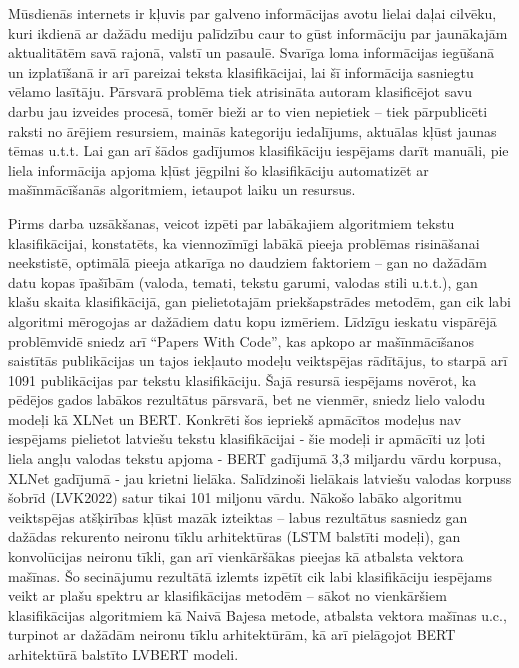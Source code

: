 Mūsdienās internets ir kļuvis par galveno informācijas avotu lielai daļai cilvēku, kuri ikdienā ar dažādu mediju palīdzību caur to gūst informāciju par jaunākajām aktualitātēm savā rajonā, valstī un pasaulē. Svarīga loma informācijas iegūšanā un izplatīšanā ir arī pareizai teksta klasifikācijai, lai šī informācija sasniegtu vēlamo lasītāju. Pārsvarā problēma tiek atrisināta autoram klasificējot savu darbu jau izveides procesā, tomēr bieži ar to vien nepietiek – tiek pārpublicēti raksti no ārējiem resursiem, mainās kategoriju iedalījums, aktuālas kļūst jaunas tēmas u.t.t. Lai gan arī šādos gadījumos klasifikāciju iespējams darīt manuāli, pie liela informācija apjoma kļūst jēgpilni šo klasifikāciju automatizēt ar mašīnmācīšanās algoritmiem, ietaupot laiku un resursus. 

Pirms darba uzsākšanas, veicot izpēti par labākajiem algoritmiem tekstu klasifikācijai, konstatēts, ka viennozīmīgi labākā pieeja problēmas risināšanai neekstistē, optimālā pieeja atkarīga no daudziem faktoriem – gan no dažādām datu kopas īpašībām (valoda, temati, tekstu garumi, valodas stili u.t.t.), gan klašu skaita klasifikācijā, gan pielietotajām priekšapstrādes metodēm, gan cik labi algoritmi mērogojas ar dažādiem datu kopu izmēriem. Līdzīgu ieskatu vispārējā problēmvidē sniedz arī “Papers With Code”, kas apkopo ar mašīnmācīšanos saistītās publikācijas un tajos iekļauto modeļu veiktspējas rādītājus, to starpā arī 1091 publikācijas par tekstu klasifikāciju. Šajā resursā iespējams novērot, ka pēdējos gados labākos rezultātus pārsvarā, bet ne vienmēr, sniedz lielo valodu modeļi kā XLNet un BERT. Konkrēti šos iepriekš apmācītos modeļus nav iespējams pielietot latviešu tekstu klasifikācijai - šie modeļi ir apmācīti uz ļoti liela angļu valodas tekstu apjoma - BERT gadījumā 3,3 miljardu vārdu korpusa, XLNet gadījumā - jau krietni lielāka. Salīdzinoši lielākais latviešu valodas korpuss šobrīd (LVK2022) satur tikai 101 miljonu vārdu. Nākošo labāko algoritmu veiktspējas atšķirības kļūst mazāk izteiktas – labus rezultātus sasniedz gan dažādas rekurento neironu tīklu arhitektūras (LSTM balstīti modeļi), gan konvolūcijas neironu tīkli, gan arī vienkāršākas pieejas kā atbalsta vektora mašīnas. Šo secinājumu rezultātā izlemts izpētīt cik labi klasifikāciju iespējams veikt ar plašu spektru ar klasifikācijas metodēm – sākot no vienkāršiem klasifikācijas algoritmiem kā Naivā Bajesa metode, atbalsta vektora mašīnas u.c., turpinot ar dažādām neironu tīklu arhitektūrām, kā arī pielāgojot BERT arhitektūrā balstīto LVBERT modeli. 

